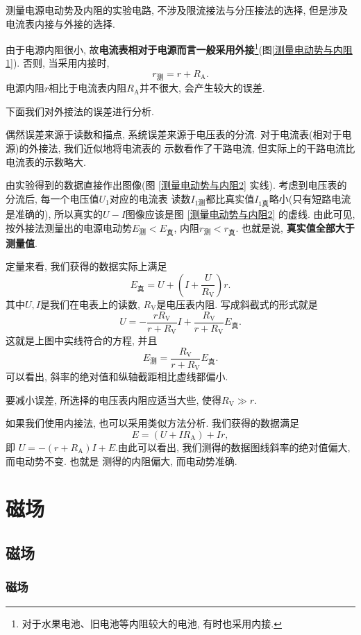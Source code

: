 \documentclass[11pt,a4paper]{ctexbook}
\begin{document}
测量电源电动势及内阻的实验电路, 不涉及限流接法与分压接法的选择, 但是涉及电流表内接与外接的选择.

由于电源内阻很小, 故\textbf{电流表相对于电源而言一般采用外接}\footnote{对于水果电池、旧电池等内阻较大的电池, 有时也采用内接.}(图\ref{测量电动势与内阻1}).
否则, 当采用内接时,$$r_\text{测} = r+R_\text{A}.$$
电源内阻$r$相比于电流表内阻$R_\text{A}$并不很大, 会产生较大的误差.

下面我们对外接法的误差进行分析.

偶然误差来源于读数和描点, 系统误差来源于电压表的分流. 对于电流表(相对于电源)的外接法, 我们近似地将电流表的
示数看作了干路电流, 但实际上的干路电流比电流表的示数略大.

由实验得到的数据直接作出图像(图 \ref{测量电动势与内阻2} 实线). 考虑到电压表的分流后, 每一个电压值$U_1$对应的电流表
读数$I_\text{1测}$都比真实值$I_\text{1真}$略小(只有短路电流是准确的), 所以真实的$U-I$图像应该是图 \ref{测量电动势与内阻2} 的虚线.
由此可见, 按外接法测量出的电源电动势$E_\text{测}<E_\text{真}$, 内阻$r_\text{测}<r_\text{真}$. 也就是说,
\textbf{真实值全部大于测量值}.


定量来看, 我们获得的数据实际上满足
$$E_\text{真} = U+\left(I+\frac{U}{R_\text{V}}\right)r.$$
其中$U,I$是我们在电表上的读数, $R_\text{V}$是电压表内阻.
写成斜截式的形式就是$$U = -\frac{rR_\text{V}}{r+R_\text{V}}I+\frac{R_\text{V}}{r+R_\text{V}}E_\text{真}.$$
这就是上图中实线符合的方程, 并且$$E_\text{测} = \frac{R_\text{V}}{r+R_\text{V}}E_\text{真}.$$
可以看出, 斜率的绝对值和纵轴截距相比虚线都偏小.

要减小误差, 所选择的电压表内阻应适当大些, 使得$R_\text{V}\gg r$.


如果我们使用内接法, 也可以采用类似方法分析. 我们获得的数据满足$$E = (U+IR_\text{A}) +Ir, $$即
$U = -(r+R_\text{A})I+E.$由此可以看出, 我们测得的数据图线斜率的绝对值偏大, 而电动势不变. 也就是
测得的内阻偏大, 而电动势准确.

\chapter{磁场}

\section{磁场}

\subsection{磁场}
\end{document}
